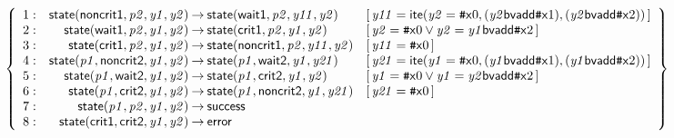 \documentclass[a4paper]{article}
\def\lthtmlcheckvsize{\ifdim\ht\sizebox<\vsize 
  \ifdim\wd\sizebox<\hsize\expandafter\hfill\fi \expandafter\vfill
  \else\expandafter\vss\fi}%
\begin{document}
{\newpage\clearpage
{}%
$\displaystyle \left\{
\begin{array}{rr@{\>}c@{\>}ll}
\mathrm{1} : 
 & \mathsf{state}(\mathsf{noncrit1},\mathit{p2},\mathit{y1},\mathit{y2})
 & \to 
 & \mathsf{state}(\mathsf{wait1},\mathit{p2},\mathit{y11},\mathit{y2})
 & [\, \mathit{y11} = \mathsf{ite}(\mathit{y2} = {\mbox{\tt\symbol{35}}\mathsf{x}{0}},(\mathit{y2} \mathsf{bvadd} {\mbox{\tt\symbol{35}}\mathsf{x}{1}}),(\mathit{y2} \mathsf{bvadd} {\mbox{\tt\symbol{35}}\mathsf{x}{2}})) \,]\\
\par
\mathrm{2} : 
 & \mathsf{state}(\mathsf{wait1},\mathit{p2},\mathit{y1},\mathit{y2})
 & \to 
 & \mathsf{state}(\mathsf{crit1},\mathit{p2},\mathit{y1},\mathit{y2})
 & [\, \mathit{y2} = {\mbox{\tt\symbol{35}}\mathsf{x}{0}} \lor \mathit{y2} = \mathit{y1} \mathsf{bvadd} {\mbox{\tt\symbol{35}}\mathsf{x}{2}} \,]\\
\par
\mathrm{3} : 
 & \mathsf{state}(\mathsf{crit1},\mathit{p2},\mathit{y1},\mathit{y2})
 & \to 
 & \mathsf{state}(\mathsf{noncrit1},\mathit{p2},\mathit{y11},\mathit{y2})
 & [\, \mathit{y11} = {\mbox{\tt\symbol{35}}\mathsf{x}{0}} \,]\\
\par
\mathrm{4} : 
 & \mathsf{state}(\mathit{p1},\mathsf{noncrit2},\mathit{y1},\mathit{y2})
 & \to 
 & \mathsf{state}(\mathit{p1},\mathsf{wait2},\mathit{y1},\mathit{y21})
 & [\, \mathit{y21} = \mathsf{ite}(\mathit{y1} = {\mbox{\tt\symbol{35}}\mathsf{x}{0}},(\mathit{y1} \mathsf{bvadd} {\mbox{\tt\symbol{35}}\mathsf{x}{1}}),(\mathit{y1} \mathsf{bvadd} {\mbox{\tt\symbol{35}}\mathsf{x}{2}})) \,]\\
\par
\mathrm{5} : 
 & \mathsf{state}(\mathit{p1},\mathsf{wait2},\mathit{y1},\mathit{y2})
 & \to 
 & \mathsf{state}(\mathit{p1},\mathsf{crit2},\mathit{y1},\mathit{y2})
 & [\, \mathit{y1} = {\mbox{\tt\symbol{35}}\mathsf{x}{0}} \lor \mathit{y1} = \mathit{y2} \mathsf{bvadd} {\mbox{\tt\symbol{35}}\mathsf{x}{2}} \,]\\
\par
\mathrm{6} : 
 & \mathsf{state}(\mathit{p1},\mathsf{crit2},\mathit{y1},\mathit{y2})
 & \to 
 & \mathsf{state}(\mathit{p1},\mathsf{noncrit2},\mathit{y1},\mathit{y21})
 & [\, \mathit{y21} = {\mbox{\tt\symbol{35}}\mathsf{x}{0}} \,]\\
\par
\mathrm{7} : 
 & \mathsf{state}(\mathit{p1},\mathit{p2},\mathit{y1},\mathit{y2})
 & \to 
 & \mathsf{success}\\
\par
\mathrm{8} : 
 & \mathsf{state}(\mathsf{crit1},\mathsf{crit2},\mathit{y1},\mathit{y2})
 & \to 
 & \mathsf{error}\\
\par
\end{array}
\right\}
$%
\lthtmlindisplaymathZ
\lthtmlcheckvsize\clearpage}
\end{document}

